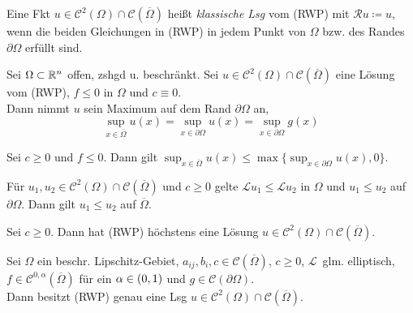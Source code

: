 \documentclass{cheat-sheet}
\newcommand{\Cont}{\mathcal{C}} %
\newcommand{\clos}[1]{\overline{#1}} %
\newcommand{\cOmega}{\clos{\Omega}} %
\newcommand{\bOmega}{\partial \Omega} %
\newcommand{\LL}{\mathcal{L}} %
\newcommand{\RR}{\mathcal{R}} %
\begin{document}
\begin{defn}
  Eine Fkt $u \in \Cont^2(\Omega) \cap \Cont(\cOmega)$ heißt \emph{klassische Lsg} vom (RWP) mit $\RR u \coloneqq u$, wenn die beiden Gleichungen in (RWP) in jedem Punkt von $\Omega$ bzw. des Randes $\bOmega$ erfüllt sind.
\end{defn}

\begin{satz}
  Sei $\Omega \subset \mathbb{R}^n$ offen, zshgd u. beschränkt.
  Sei $u \in \Cont^2(\Omega) \cap \Cont(\cOmega)$ eine Lösung vom (RWP), $f \leq 0$ in $\Omega$ und $c \equiv 0$. \\
  Dann nimmt $u$ sein Maximum auf dem Rand $\bOmega$ an, \dh{}
  \[ \sup_{x \in \cOmega} u(x) = \sup_{x \in \bOmega} u(x) = \sup_{x \in \bOmega} g(x) \]
\end{satz}


\begin{kor}
  Sei $c \geq 0$ und $f \leq 0$.
  Dann gilt
  $\sup_{x \in \cOmega} u(x) \leq \max \{ \sup_{x \in \bOmega} u(x), 0 \}$.
\end{kor}

\begin{kor}
  Für $u_1, u_2 \in \Cont^2(\Omega) \cap \Cont(\cOmega)$ und $c \geq 0$ gelte $\LL u_1 \leq \LL u_2$ in $\Omega$ und $u_1 \leq u_2$ auf $\bOmega$.
  Dann gilt $u_1 \leq u_2$ auf $\cOmega$.
\end{kor}

\begin{kor}[Eindeutigkeit]
  Sei $c \geq 0$. Dann hat (RWP) höchstens eine Lösung $u \in \Cont^2(\Omega) \cap \Cont(\cOmega)$.
\end{kor}

\iffalse
\begin{bsp}
  Betrachte $-u'' - \lambda u = 0$ in $\Omega = \ointerval{0}{1}$ mit $\lambda > 0$, $u(0) = u(1) = 0$.
  \begin{itemize}
    \item $u \equiv 0$ ist eine Lösung
    \item Für $\lambda = k^2 \pi^2$ ist $u(x) = a \sin(k \pi x)$ auch eine Lösung
  \end{itemize}
\end{bsp}
\fi

\begin{satz}
  Sei $\Omega$ ein beschr. Lipschitz-Gebiet, $a_{ij}, b_i, c \in \Cont(\cOmega)$, $c \geq 0$, $\LL$~glm. elliptisch, $f \in \Cont^{0,\alpha}(\cOmega)$ für ein $\alpha \in \left( 0, 1 \right)$ und $g \in \Cont(\bOmega)$. \\
  Dann besitzt (RWP) genau eine Lsg $u \in \Cont^2(\Omega) \cap \Cont(\cOmega)$.
\end{satz}
\end{document}
